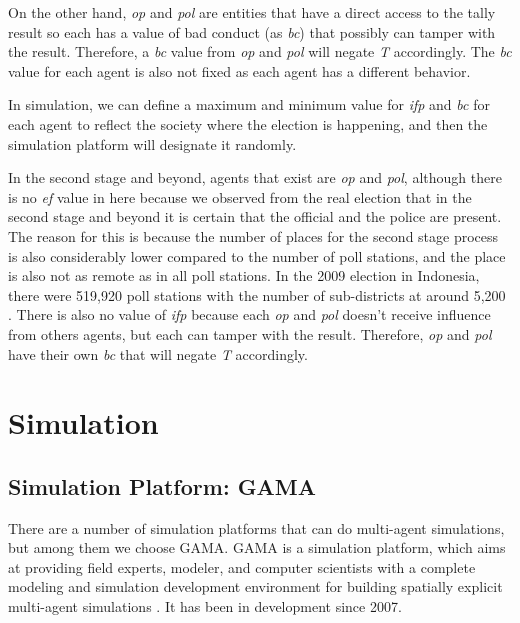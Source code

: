 \documentclass[JIP]{ipsj}
\begin{document}
On the other hand, \textit{op} and \textit{pol} are entities that have a direct access to the tally result so each has a value of bad conduct (as \textit{bc}) that possibly can tamper with the result. Therefore, a \textit{bc} value from \textit{op} and \textit{pol} will negate \textit{T} accordingly. The \textit{bc} value for each agent is also not fixed as each agent has a different behavior.

In simulation, we can define a maximum and minimum value for \textit{ifp} and \textit{bc} for each agent to reflect the society where the election is happening, and then the simulation platform will designate it randomly.

In the second stage and beyond, agents that exist are \textit{op} and \textit{pol}, although there is no \textit{ef} value in here because we observed from the real election that in the second stage and beyond it is certain that the official and the police are present. The reason for this is because the number of places for the second stage process is also considerably lower compared to the number of poll stations, and the place is also not as remote as in all poll stations. In the 2009 election in Indonesia, there were 519,920 poll stations with the number of sub-districts at around 5,200 \cite{KPU200903}\cite{PemiluIndonesia20090313}. There is also no value of \textit{ifp} because each \textit{op} and \textit{pol} doesn't receive influence from others agents, but each can tamper with the result. Therefore, \textit{op} and \textit{pol} have their own \textit{bc} that will negate \textit{T} accordingly.


\section{Simulation}
\subsection{Simulation Platform: GAMA}

There are a number of simulation platforms that can do multi-agent simulations, but among them we choose GAMA. GAMA is a simulation platform, which aims at providing field experts, modeler, and computer scientists with a complete modeling and simulation development environment for building spatially explicit multi-agent simulations \cite{GAMAplatform}. It has been in development since 2007.
\end{document}
